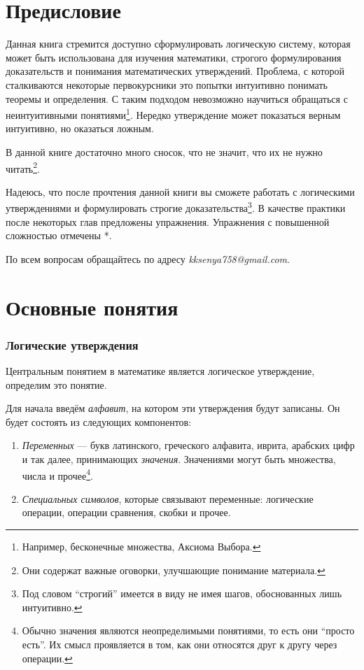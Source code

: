 \part{Предисловие}

Данная книга стремится доступно сформулировать логическую систему,
которая может быть использована для изучения математики, строгого
формулирования доказательств и понимания математических утверждений.
Проблема, с которой сталкиваются некоторые первокурсники это попытки
интуитивно понимать теоремы и определения. С таким подходом невозможно
научиться обращаться с неинтуитивными
понятиями\footnote{Например, бесконечные множества, Аксиома Выбора.}.
Нередко утверждение может показаться верным интуитивно,
но оказаться ложным.

В данной книге достаточно много сносок, что не значит, что их
не нужно читать\footnote{Они содержат важные оговорки,
	улучшающие понимание материала.}.

Надеюсь, что после прочтения данной книги вы сможете работать с логическими
утверждениями и формулировать строгие доказательства\footnote{Под словом ``строгий''
	имеется в виду не имея шагов, обоснованных лишь интуитивно.}. В качестве практики
после некоторых глав предложены упражнения. Упражнения с повышенной сложностью
отмечены *.

По всем вопросам обращайтесь по адресу {\sl kksenya758@gmail.com}.

\part{Основные понятия}

\section{Логические утверждения}

Центральным понятием в математике является логическое утверждение,
определим это понятие.

Для начала введём {\it алфавит}, на котором эти утверждения будут записаны.
Он будет состоять из следующих компонентов:
\begin{enumerate}
	\item{}{\it Переменных} --- букв латинского, греческого алфавита,
	иврита, арабских цифр и так далее, принимающих {\it значения}.
	Значениями могут быть множества, числа и прочее\footnote{Обычно значения
		являются неопределимыми понятиями, то есть они ``просто есть''. Их смысл
		проявляется в том, как они относятся друг к другу через операции.}.
	\item{}{\it Специальных символов}, которые связывают переменные:
	логические операции, операции сравнения, скобки и прочее.
\end{enumerate}

